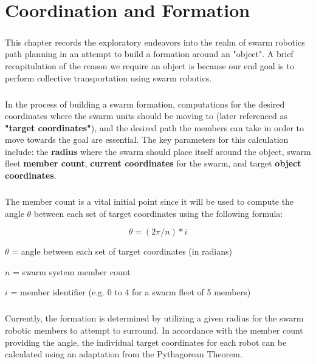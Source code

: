 \chapter{Coordination and Formation}

\paragraph*{}
This chapter records the exploratory endeavors into the realm of swarm robotics path planning in an attempt to build a formation around an "object". A brief recapitulation of the reason we require an object is because our end goal is to perform collective transportation using swarm robotics.

\paragraph*{}
In the process of building a swarm formation, computations for the desired coordinates where the swarm units should be moving to (later referenced as \textbf{"target coordinates"}), and the desired path the members can take in order to move towards the goal are essential. The key parameters for this calculation include: the \textbf{radius} where the swarm should place itself around the object, swarm fleet \textbf{member count}, \textbf{current coordinates} for the swarm, and target \textbf{object coordinates}.

\paragraph*{}
The member count is a vital initial point since it will be used to compute the angle \(\theta\) between each set of target coordinates using the following formula:

\[\theta = (2\pi / n) * i\]

\begin{description}
    \item[where:]
    \item \(\theta\) = angle between each set of target coordinates (in radians)
    \item \(n\) = swarm system member count
    \item \(i\) = member identifier (e.g. 0 to 4 for a swarm fleet of 5 members)
\end{description}

\paragraph*{}
Currently, the formation is determined by utilizing a given radius for the swarm robotic members to attempt to surround. In accordance with the member count providing the angle, the individual target coordinates for each robot can be calculated using an adaptation from the Pythagorean Theorem. 

